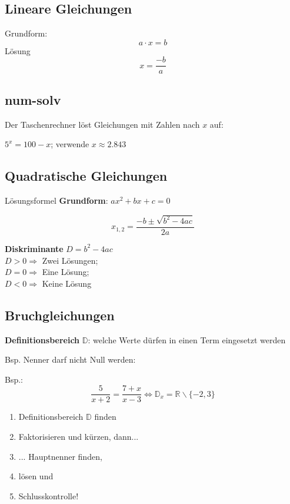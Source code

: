 \begin{multicols}{2}
\subsection*{Lineare Gleichungen}

Grundform:
$$a\cdot{}x = b$$
Lösung
$$x = \frac{-b}{a}$$

\subsection*{num-solv}
Der Taschenrechner löst Gleichungen mit Zahlen nach $x$ auf:

$5^x = 100 -x$; verwende  $x\approx{}2.843$

\subsection*{Quadratische Gleichungen}
\begin{gesetz*}{Lösungsformel}{}
\textbf{Grundform}: $ax^2 + bx+c = 0$

$$x_{1,2} = \frac{-b \pm \sqrt{b^2-4ac}}{2a}$$
\end{gesetz*}

\textbf{Diskriminante} $D = b^2-4ac$\\
$D>0\Rightarrow$ Zwei Lösungen;\\
$D=0\Rightarrow$ Eine Lösung;\\
$D<0\Rightarrow$ Keine Lösung

\hrulefill



\subsection*{Bruchgleichungen}

\begin{definition*}{}{}

\textbf{Definitionsbereich} $\mathbb{D}$: welche Werte dürfen in einen Term eingesetzt werden

Bsp. Nenner darf nicht Null werden:

Bsp.: $$\frac5{x+2}=\frac{7+x}{x-3} \Leftrightarrow{} \mathbb{D}_x=\mathbb{R}\backslash{}\{-2, 3\}$$
\end{definition*}

\begin{rezept*}{}{}
\begin{enumerate}
\item Definitionsbereich $\mathbb{D}$ finden
\item Faktorisieren und kürzen, dann...
\item ... Hauptnenner finden,
\item lösen und 
\item Schlusskontrolle!
\end{enumerate}
\end{rezept*}


\end{multicols}
